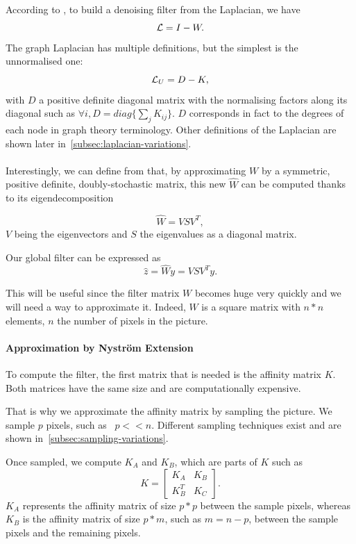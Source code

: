 \paragraph{}
According to \cite{modern_tour_2013}, to build a denoising filter from the Laplacian, we have
\[\operatorname{\mathcal{L}} = I - W.\]
The graph Laplacian has multiple definitions, but the simplest is the unnormalised one:
\[\operatorname{\mathcal{L}}_U = D - K,\]
with \(D\) a positive definite diagonal matrix with the normalising factors along its diagonal such as \(\forall i, D = diag\{\sum_j K_{ij}\}\).
\(D\) corresponds in fact to the degrees of each node in graph theory terminology.
Other definitions of the Laplacian are shown later in~\ref{subsec:laplacian-variations}.

\paragraph{}
Interestingly, we can define from \cite{glide_2014} that, by approximating \(W\) by a symmetric, positive definite, doubly-stochastic matrix, this new \(\hat{W}\) can be computed thanks to its eigendecomposition

\[\hat{W} = VSV^T,\]
\(V\) being the eigenvectors and \(S\) the eigenvalues as a diagonal matrix.

Our global filter can be expressed as
\[\hat{z} = \hat{W}y = VSV^Ty.\]

This will be useful since the filter matrix \(W\) becomes huge very quickly and we will need a way to approximate it. Indeed, \(W\) is a square matrix with \(n*n\) elements, \(n\) the number of pixels in the picture.

\paragraph{Approximation by Nystr\"om Extension}

To compute the filter, the first matrix that is needed is the affinity matrix \(K\).
Both matrices have the same size and are computationally expensive.

That is why we approximate the affinity matrix by sampling the picture.
We sample \(p\) pixels, such as  \(p << n\). Different sampling techniques exist and are shown in~\ref{subsec:sampling-variations}.

Once sampled, we compute \(K_A\) and \(K_B\), which are parts of \(K\) such as
\[
 K = \begin{bmatrix}
  K_A & K_B \\
  K_B^T & K_C
 \end{bmatrix}.
\]
\(K_A\) represents the affinity matrix of size \(p*p\) between the sample pixels, whereas \(K_B\) is the affinity matrix of size \(p*m\), such as \(m = n-p\), between the sample pixels and the remaining pixels.

